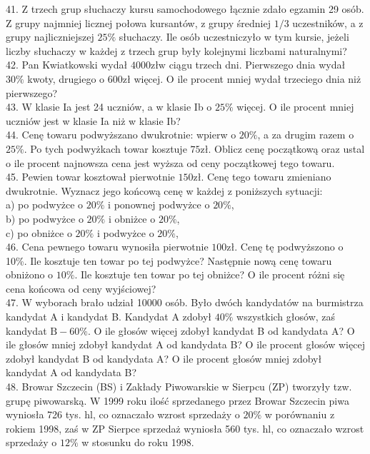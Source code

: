 \documentclass[10pt]{article}
\begin{document}
41. Z trzech grup słuchaczy kursu samochodowego łącznie zdało egzamin 29 osób. Z grupy najmniej licznej połowa kursantów, z grupy średniej \(1 / 3\) uczestników, a z grupy najliczniejszej \(25 \%\) słuchaczy. Ile osób uczestniczyło w tym kursie, jeżeli liczby słuchaczy w każdej z trzech grup były kolejnymi liczbami naturalnymi?\\
42. Pan Kwiatkowski wydał \(4000 \mathrm{zł} \mathrm{w}\) ciągu trzech dni. Pierwszego dnia wydał \(30 \%\) kwoty, drugiego o \(600 \mathrm{zł}\) więcej. O ile procent mniej wydał trzeciego dnia niż pierwszego?\\
43. W klasie Ia jest 24 uczniów, a w klasie Ib o \(25 \%\) więcej. O ile procent mniej uczniów jest w klasie Ia niż w klasie Ib?\\
44. Cenę towaru podwyższano dwukrotnie: wpierw o \(20 \%\), a za drugim razem o \(25 \%\). Po tych podwyżkach towar kosztuje \(75 \mathrm{zł}\). Oblicz cenę początkową oraz ustal o ile procent najnowsza cena jest wyższa od ceny początkowej tego towaru.\\
45. Pewien towar kosztował pierwotnie \(150 \mathrm{zł}\). Cenę tego towaru zmieniano dwukrotnie. Wyznacz jego końcową cenę w każdej z poniższych sytuacji:\\
a) po podwyżce o \(20 \%\) i ponownej podwyżce o \(20 \%\),\\
b) po podwyżce o \(20 \%\) i obniżce o \(20 \%\),\\
c) po obniżce o \(20 \%\) i podwyżce o \(20 \%\),\\
46. Cena pewnego towaru wynosiła pierwotnie \(100 \mathrm{zł}\). Cenę tę podwyższono o 10\%. Ile kosztuje ten towar po tej podwyżce? Następnie nową cenę towaru obniżono o \(10 \%\). Ile kosztuje ten towar po tej obniżce? O ile procent różni się cena końcowa od ceny wyjściowej?\\
47. W wyborach brało udział 10000 osób. Było dwóch kandydatów na burmistrza kandydat A i kandydat B. Kandydat A zdobył \(40 \%\) wszystkich głosów, zaś kandydat \(\mathrm{B}-60 \%\). O ile głosów więcej zdobył kandydat B od kandydata A? O ile głosów mniej zdobył kandydat A od kandydata B? O ile procent głosów więcej zdobył kandydat B od kandydata A? O ile procent głosów mniej zdobył kandydat A od kandydata B?\\
48. Browar Szczecin (BS) i Zakłady Piwowarskie w Sierpcu (ZP) tworzyły tzw. grupę piwowarską. W 1999 roku ilość sprzedanego przez Browar Szczecin piwa wyniosła 726 tys. hl, co oznaczało wzrost sprzedaży o \(20 \%\) w porównaniu z rokiem 1998, zaś w ZP Sierpce sprzedaż wyniosła 560 tys. hl, co oznaczało wzrost sprzedaży o \(12 \%\) w stosunku do roku 1998.\\
\end{document}
